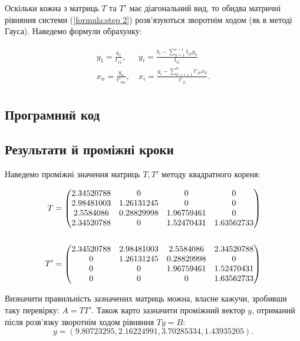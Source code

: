 \documentclass[a4paper,14pt]{extarticle} %
\begin{document}
Оскільки кожна з матриць $T$ та $T'$ має діагональний вид, то обидва 
матричні рівняння системи (\ref{formula:step 2}) розв'язуються зворотнім 
ходом (як в методі Гауса). Наведемо формули обрахунку:  

\begin{align*}
    y_1=\frac{b_1}{t_{11}},\ &y_i=\frac{b_i-\sum\limits_{k=1}^{i-1}t_{ik}y_k}{t_{ii}} \\
    x_n=\frac{y_n}{t'_{nn}},\ &x_i=\frac{y_i-\sum\limits_{k=i+1}^{n}t'_{ik}x_k}{t'_{ii}}. \\
\end{align*}

\subsection*{Програмний код}



\newpage
\subsection*{Результати й проміжні кроки}

Наведемо проміжні значення матриць $T, T'$ методу квадратного кореня:

\begin{align}
T = 
\begin{pmatrix} 
    2.34520788 & 0          & 0          & 0          \\
    2.98481003 & 1.26131245 & 0          & 0          \\
    2.5584086  & 0.28829998 & 1.96759461 & 0          \\
    2.34520788 & 0          & 1.52470431 & 1.63562733 \\
\end{pmatrix} \\ {} \notag \\
T' =
\begin{pmatrix}
    2.34520788 & 2.98481003 & 2.5584086  & 2.34520788 \\
    0          & 1.26131245 & 0.28829998 & 0          \\
    0          & 0          & 1.96759461 & 1.52470431 \\
    0          & 0          & 0          & 1.63562733 \\
\end{pmatrix}
\end{align}

Визначити правильність зазначених матриць можна, власне кажучи, 
зробивши таку перевірку: $A=TT'$. Також варто зазначити проміжний вектор $y$, 
отриманий після розв'язку зворотнім ходом рівняння $Ty=B$:
\[ y = (9.80723295, 2.16224991, 3.70285334, 1.43935205). \]
\end{document}
